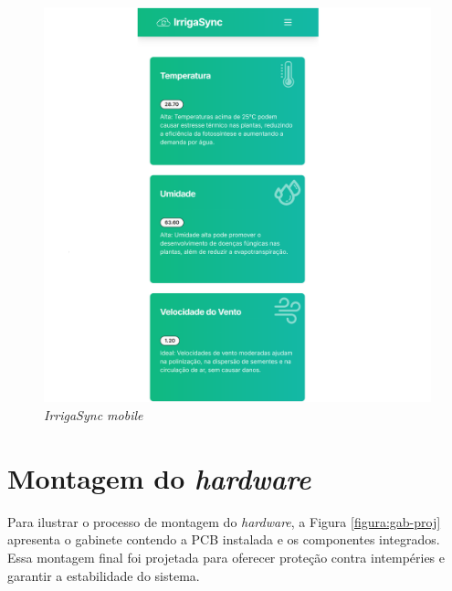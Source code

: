 \begin{figure}[!htb] \centering
\caption{\textit{IrrigaSync mobile}} \label{figura:irrigaMobile}
\begin{varwidth}{\linewidth}
\includegraphics[width=16cm]{figuras/irrigaSyncMobile.png}
\end{varwidth}
\end{figure}

\section{Montagem do \textit{hardware}}

Para ilustrar o processo de montagem do \textit{hardware}, a Figura \ref{figura:gab-proj} apresenta o gabinete contendo a PCB instalada e os componentes integrados. Essa montagem final foi projetada para oferecer proteção contra intempéries e garantir a estabilidade do sistema.

